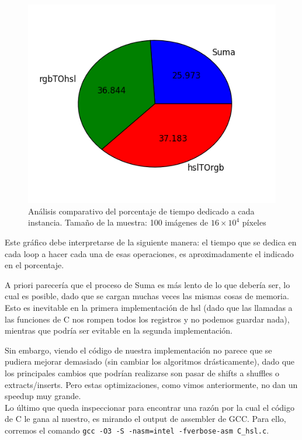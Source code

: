 \begin{figure}[H] 
	\centering
  \includegraphics[scale=0.7]{images/hsl-div.png}
  \caption{Análisis comparativo del porcentaje de tiempo dedicado a cada instancia. Tamaño de la muestra: 100 imágenes de $16\times 10^4$ píxeles}
\end{figure}

Este gráfico debe interpretarse de la siguiente manera: el tiempo que se dedica en cada loop a hacer cada una de esas operaciones, es aproximadamente el indicado en el porcentaje.

A priori parecería que el proceso de Suma es más lento de lo que debería ser, lo cual es posible, dado que se cargan muchas veces las mismas cosas de memoria. Esto es inevitable en la primera implementación de hsl (dado que las llamadas a las funciones de C nos rompen todos los registros y no podemos guardar nada), mientras que podría ser evitable en la segunda implementación.

Sin embargo, viendo el código de nuestra implementación no parece que se pudiera mejorar demasiado (sin cambiar los algoritmos drásticamente), dado que los principales cambios que podrían realizarse son pasar de shifts a shuffles o extracts/inserts. Pero estas optimizaciones, como vimos anteriormente, no dan un speedup muy grande.
\\

Lo último que queda inspeccionar para encontrar una razón por la cual el código de C le gana al nuestro, es mirando el output de assembler de GCC. Para ello, corremos el comando \texttt{gcc -O3 -S -nasm=intel -fverbose-asm C\_hsl.c}.

